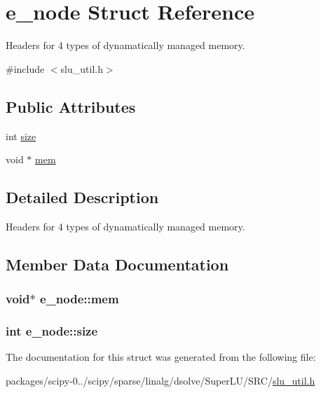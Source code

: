 \hypertarget{structe__node}{}\section{e\+\_\+node Struct Reference}
\label{structe__node}


Headers for 4 types of dynamatically managed memory.  




{\ttfamily \#include $<$slu\+\_\+util.\+h$>$}

\subsection*{Public Attributes}
\begin{DoxyCompactItemize}
\item 
int \hyperlink{structe__node_a2b5a49fe848fe66d1643a37ae2a842eb}{size}
\item 
void $\ast$ \hyperlink{structe__node_a6a040bdcee064559b0b480a96ccfac65}{mem}
\end{DoxyCompactItemize}


\subsection{Detailed Description}
Headers for 4 types of dynamatically managed memory. 

\subsection{Member Data Documentation}
\hypertarget{structe__node_a6a040bdcee064559b0b480a96ccfac65}{}
\subsubsection[{mem}]{\setlength{\rightskip}{0pt plus 5cm}void$\ast$ e\+\_\+node\+::mem}\label{structe__node_a6a040bdcee064559b0b480a96ccfac65}
\hypertarget{structe__node_a2b5a49fe848fe66d1643a37ae2a842eb}{}
\subsubsection[{size}]{\setlength{\rightskip}{0pt plus 5cm}int e\+\_\+node\+::size}\label{structe__node_a2b5a49fe848fe66d1643a37ae2a842eb}


The documentation for this struct was generated from the following file\+:\begin{DoxyCompactItemize}
\item 
packages/scipy-\/0../scipy/sparse/linalg/dsolve/\+Super\+L\+U/\+S\+R\+C/\hyperlink{slu__util_8h}{slu\+\_\+util.\+h}\end{DoxyCompactItemize}
